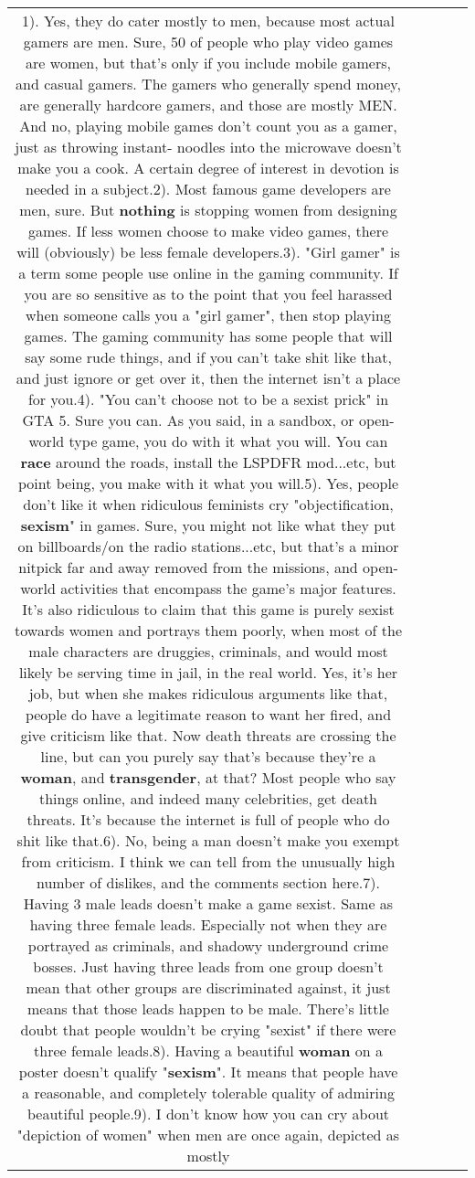 \documentclass[11pt]{article}
\newlength\mylength
\begin{document}
\begin{center}
\begin{longtable}{|C{.65\mylength}|C{.30\mylength}|C{.12\mylength}|C{.12\mylength}|C{.12\mylength}|}
  \small 1). Yes, they do cater mostly to men, because most actual gamers are men. Sure, 50 of people who play video games are women, but that's only if you include mobile gamers, and casual gamers. The gamers who generally spend money, are generally hardcore gamers, and those are mostly MEN. And no, playing mobile games don't count you as a gamer, just as throwing instant- noodles into the microwave doesn't make you a cook. A certain degree of interest in devotion is needed in a subject.2). Most famous game developers are men, sure. But \textbf{nothing} is stopping women from designing games. If less women choose to make video games, there will (obviously) be less female developers.3). "Girl gamer" is a term some people use online in the gaming community. If you are so sensitive as to the point that you feel harassed when someone calls you a "girl gamer", then stop playing games. The gaming community has some people that will say some rude things, and if you can't take shit like that, and just ignore or get over it, then the internet isn't a place for you.4). "You can't choose not to be a sexist prick" in GTA 5. Sure you can. As you said, in a sandbox, or open-world type game, you do with it what you will. You can \textbf{race} around the roads, install the LSPDFR mod...etc, but point being, you make with it what you will.5). Yes, people don't like it when ridiculous feminists cry "objectification, \textbf{sexism}" in games. Sure, you might not like what they put on billboards/on the radio stations...etc, but that's a minor nitpick far and away removed from the missions, and open-world activities that encompass the game's major features. It's also ridiculous to claim that this game is purely sexist towards women and portrays them poorly, when most of the male characters are druggies, criminals, and would most likely be serving time in jail, in the real world. Yes, it's her job, but when she makes ridiculous arguments like that, people do have a legitimate reason to want her fired, and give criticism like that. Now death threats are crossing the line, but can you purely say that's because they're a \textbf{woman}, and \textbf{transgender}, at that? Most people who say things online, and indeed many celebrities, get death threats. It's because the internet is full of people who do shit like that.6). No, being a man doesn't make you exempt from criticism. I think we can tell from the unusually high number of dislikes,  and the comments section here.7). Having 3 male leads doesn't make a game sexist. Same as having three female leads. Especially not when they are portrayed as criminals, and shadowy underground crime bosses. Just having three leads from one group doesn't mean that other groups are discriminated against, it just means that those leads happen to be male. There's little doubt that people wouldn't be crying "sexist" if there were three female leads.8). Having a beautiful \textbf{woman} on a poster doesn't qualify "\textbf{sexism}". It means that people have a reasonable, and completely tolerable quality of admiring beautiful people.9). I don't know how you can cry about "depiction of women" when men are once again, depicted as mostly 
\end{longtable}
\end{center}
\end{document}
